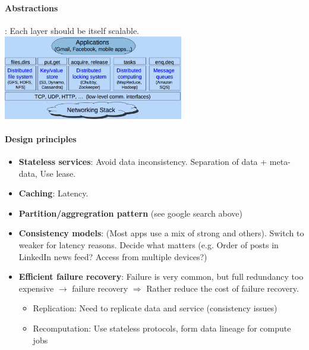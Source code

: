 \paragraph{Abstractions}: Each layer should be itself scalable.\\
    \includegraphics[width=0.59\textwidth]{img/abstraction.png}\\

\paragraph{Design principles}
\begin{itemize}
\item \textbf{Stateless services}: Avoid data inconsistency. Separation of data +
  meta-data, Use lease.
\item \textbf{Caching}: Latency.
\item \textbf{Partition/aggregration pattern} (see google search above)
\item \textbf{Consistency models}: (Most apps use a mix of strong and others).
  Switch to weaker for latency reasons. Decide what matters (e.g. Order of posts
  in LinkedIn news feed? Access from multiple devices?)
\item \textbf{Efficient failure recovery}: Failure is very common, but full redundancy
  too expensive $\rightarrow$ failure recovery $\Rightarrow$ Rather reduce the cost of failure recovery.
  \begin{itemize}
    \item Replication: Need to replicate data and service (consistency issues)
      \item Recomputation: Use stateless protocols, form data lineage for compute jobs
  \end{itemize}
\end{itemize}